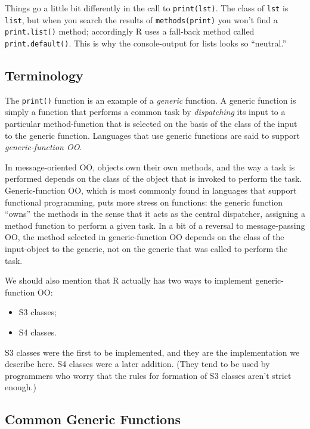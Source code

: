 \documentclass[]{book}
\providecommand{\tightlist}{%
  \setlength{\itemsep}{0pt}\setlength{\parskip}{0pt}}
\theoremstyle{definition}
\theoremstyle{definition}
\theoremstyle{remark}
\begin{document}
{Things go a little bit differently in the call to \texttt{print(lst)}.
The class of \texttt{lst} is \texttt{list}, but when you search the
results of \texttt{methods(print)} you won't find a
\texttt{print.list()} method; accordingly R uses a fall-back method
called \texttt{print.default()}. This is why the console-output for
lists looks so ``neutral.''

\subsection{Terminology}\label{terminology}

The \texttt{print()} function is an example of a \emph{generic}
function.  A generic function is simply a
function that performs a common task by \emph{dispatching} its input to
a particular method-function that is selected on the basis of the class
of the input to the generic function. Languages that use generic
functions are said to support \emph{generic-function OO}.

In message-oriented OO, objects own their own methods, and the way a
task is performed depends on the class of the object that is invoked to
perform the task. Generic-function OO, which is most commonly found in
languages that support functional programming, puts more stress on
functions: the generic function ``owns'' the methods in the sense that
it acts as the central dispatcher, assigning a method function to
perform a given task. In a bit of a reversal to message-passing OO, the
method selected in generic-function OO depends on the class of the
input-object to the generic, not on the generic that was called to
perform the task.

We should also mention that R actually has two ways to implement
generic-function OO:

\begin{itemize}
\tightlist
\item
  S3 classes;
\item
  S4 classes.
\end{itemize}

S3 classes were the first to be implemented, and they are the
implementation we describe here. S4 classes were a later addition. (They
tend to be used by programmers who worry that the rules for formation of
S3 classes aren't strict enough.)

\subsection{Common Generic Functions}\label{common-generic-functions}

}
\end{document}

